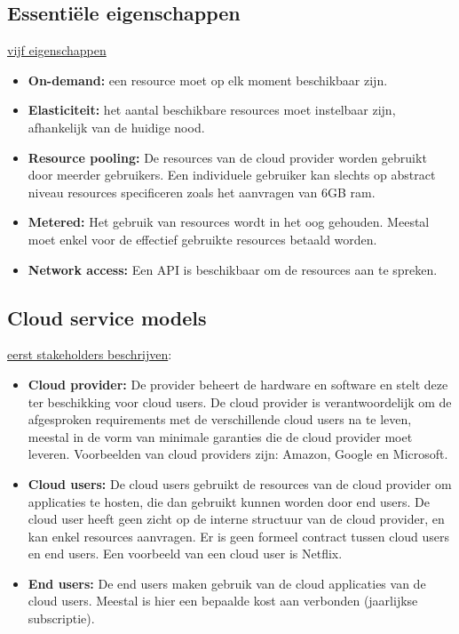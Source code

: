 	\subsection{Essentiële eigenschappen}
	\underline{vijf eigenschappen}
	\begin{itemize}
		\item[\info] \textbf{On-demand:} een resource moet op elk moment beschikbaar zijn.
		\item[\info] \textbf{Elasticiteit:} het aantal beschikbare resources moet instelbaar zijn, afhankelijk van de huidige nood.
		\item[\info] \textbf{Resource pooling:} De resources van de cloud provider worden gebruikt door meerder gebruikers. Een individuele gebruiker kan slechts op abstract niveau resources specificeren zoals het aanvragen van 6GB ram.
		\item[\info] \textbf{Metered:} Het gebruik van resources wordt in het oog gehouden. Meestal moet enkel voor de effectief gebruikte resources betaald worden.
		\item[\info] \textbf{Network access:} Een API is beschikbaar om de resources aan te spreken.
	\end{itemize}
	\subsection{Cloud service models}
	\underline{eerst stakeholders beschrijven}:
	\begin{itemize}
		\item[\info] \textbf{Cloud provider:} De provider beheert de hardware en software en stelt deze ter beschikking voor cloud users. De cloud provider is verantwoordelijk om de afgesproken requirements met de verschillende cloud users na te leven, meestal in de vorm van minimale garanties die de cloud provider moet leveren. Voorbeelden van cloud providers zijn: Amazon, Google en Microsoft.
		\item[\info] \textbf{Cloud users:} De cloud users gebruikt de resources van de cloud provider om applicaties te hosten, die dan gebruikt kunnen worden door end users. De cloud user heeft geen zicht op de interne structuur van de cloud provider, en kan enkel resources aanvragen. Er is geen formeel contract tussen cloud users en end users. Een voorbeeld van een cloud user is Netflix.
		\item[\info] \textbf{End users:} De end users maken gebruik van de cloud applicaties van de cloud users. Meestal is hier een bepaalde kost aan verbonden (jaarlijkse subscriptie).
	\end{itemize}

